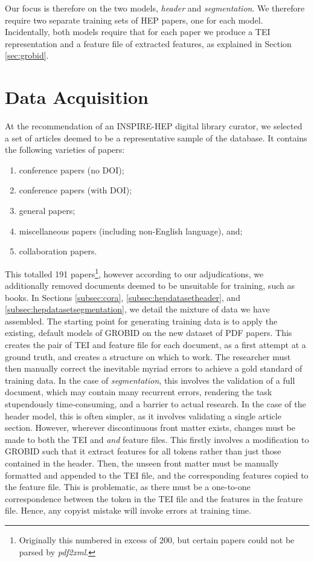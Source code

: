 Our focus is therefore on the two models, \emph{header} and \emph{segmentation}. We therefore require two separate training sets of HEP papers, one for each model. Incidentally, both models require that for each paper we produce a TEI representation and a feature file of extracted features, as explained in Section \ref{sec:grobid}.

\section{Data Acquisition}
\label{sec:data}

At the recommendation of an INSPIRE-HEP digital library curator, we selected a set of articles deemed to be a representative sample of the database. It contains the following varieties of papers:

\begin{enumerate}
\item conference papers (no DOI);
\item conference papers (with DOI);
\item general papers;
\item miscellaneous papers (including non-English language), and;
\item collaboration papers.
\end{enumerate}

This totalled 191 papers\footnote{Originally this numbered in excess of 200, but certain papers could not be parsed by \emph{pdf2xml}.}, however according to our adjudications, we additionally removed documents deemed to be unsuitable for training, such as books. In Sections \ref{subsec:cora}, \ref{subsec:hepdatasetheader}, and \ref{subsec:hepdatasetsegmentation}, we detail the mixture of data we have assembled. The starting point for generating training data is to apply the existing, default models of GROBID on the new dataset of PDF papers. This creates the pair of TEI and feature file for each document, as a first attempt at a ground truth, and creates a structure on which to work. The researcher must then manually correct the inevitable myriad errors to achieve a gold standard of training data. In the case of \emph{segmentation}, this involves the validation of a full document, which may contain many recurrent errors, rendering the task stupendously time-consuming, and a barrier to actual research. In the case of the header model, this is often simpler, as it involves validating a single article section. However, wherever discontinuous front matter exists, changes must be made to both the TEI and \emph{and} feature files. This firstly involves a modification to GROBID such that it extract features for all tokens rather than just those contained in the header. Then, the unseen front matter must be manually formatted and appended to the TEI file, and the corresponding features copied to the feature file. This is problematic, as there must be a one-to-one correspondence between the token in the TEI file and the features in the feature file. Hence, any copyist mistake will invoke errors at training time.

